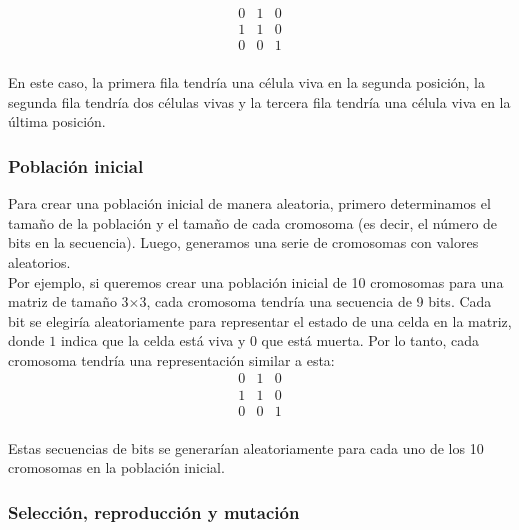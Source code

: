 \[
\begin{matrix}
    0 & 1 & 0 \\
    1 & 1 & 0 \\
    0 & 0 & 1 \\
    \end{matrix}
\]

En este caso, la primera fila tendría una célula viva en la segunda posición, la segunda fila 
tendría dos células vivas y la tercera fila tendría una célula viva en la última posición.


\subsubsection*{Población inicial}

Para crear una población inicial de manera aleatoria, primero determinamos el tamaño de la población
y el tamaño de cada cromosoma (es decir, el número de bits en la secuencia). Luego, generamos una 
serie de cromosomas con valores aleatorios.\\ 

Por ejemplo, si queremos crear una población inicial de 10 cromosomas para una matriz de tamaño 
3$\times$3, cada cromosoma tendría una secuencia de 9 bits. Cada bit se elegiría aleatoriamente para 
representar el estado de una celda en la matriz, donde $1$ indica que la celda está viva y 
$0$ que está muerta. Por lo tanto, cada cromosoma tendría una representación similar a esta:\\ 

\[
\begin{matrix}
0 & 1 & 0 \\
1 & 1 & 0 \\
0 & 0 & 1 \\
\end{matrix}
\]

Estas secuencias de bits se generarían aleatoriamente para cada uno de los 10 cromosomas en 
la población inicial.

\subsubsection*{Selección, reproducción y mutación}


